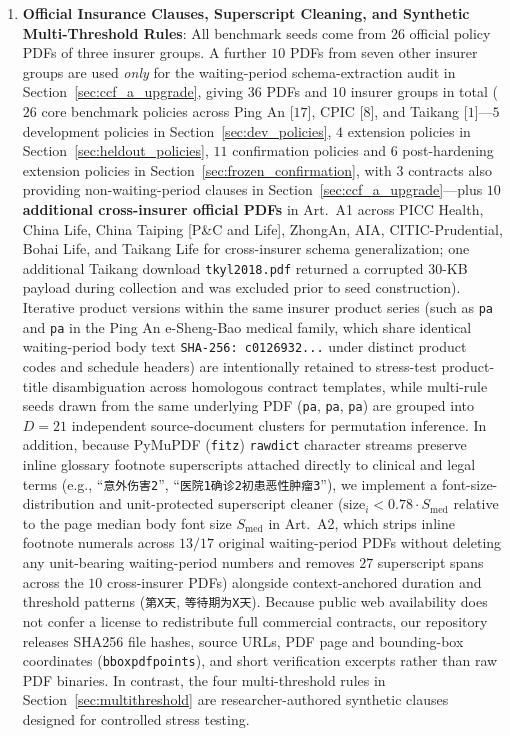 \documentclass[10pt,twocolumn]{article}
\renewcommand{\_}{\textunderscore\allowbreak}
\begin{document}
\begin{enumerate}[leftmargin=*,nosep]
  \item \textbf{Official Insurance Clauses, Superscript Cleaning, and Synthetic Multi-Threshold Rules}: All benchmark seeds come from $26$ official policy PDFs of three insurer groups. A further $10$ PDFs from seven other insurer groups are used \emph{only} for the waiting-period schema-extraction audit in Section~\ref{sec:ccf_a_upgrade}, giving $36$ PDFs and $10$ insurer groups in total ($26$ core benchmark policies across Ping An [$17$], CPIC [$8$], and Taikang [$1$]---$5$ development policies in Section~\ref{sec:dev_policies}, $4$ extension policies in Section~\ref{sec:heldout_policies}, $11$ confirmation policies and $6$ post-hardening extension policies in Section~\ref{sec:frozen_confirmation}, with $3$ contracts also providing non-waiting-period clauses in Section~\ref{sec:ccf_a_upgrade}---plus \textbf{$10$ additional cross-insurer official PDFs} in Art.~A1 across PICC Health, China Life, China Taiping [P\&C and Life], ZhongAn, AIA, CITIC-Prudential, Bohai Life, and Taikang Life for cross-insurer schema generalization; one additional Taikang download \texttt{tkyl\_2018.pdf} returned a corrupted 30-KB payload during collection and was excluded prior to seed construction). Iterative product versions within the same insurer product series (such as \texttt{pa\_595} and \texttt{pa\_597} in the Ping An e-Sheng-Bao medical family, which share identical waiting-period body text \texttt{SHA-256: c0126932...} under distinct product codes and schedule headers) are intentionally retained to stress-test product-title disambiguation across homologous contract templates, while multi-rule seeds drawn from the same underlying PDF (\texttt{pa\_2651}, \texttt{pa\_2650}, \texttt{pa\_1073}) are grouped into $D=21$ independent source-document clusters for permutation inference. In addition, because PyMuPDF (\texttt{fitz}) \texttt{rawdict} character streams preserve inline glossary footnote superscripts attached directly to clinical and legal terms (e.g., ``\texttt{意外伤害2}'', ``\texttt{医院1确诊2初患恶性肿瘤3}''), we implement a font-size-distribution and unit-protected superscript cleaner ($\text{size}_i < 0.78 \cdot S_{\text{med}}$ relative to the page median body font size $S_{\text{med}}$ in Art.~A2, which strips inline footnote numerals across $13/17$ original waiting-period PDFs without deleting any unit-bearing waiting-period numbers and removes $27$ superscript spans across the $10$ cross-insurer PDFs) alongside context-anchored duration and threshold patterns (\texttt{第X天}, \texttt{等待期为X天}). Because public web availability does not confer a license to redistribute full commercial contracts, our repository releases SHA256 file hashes, source URLs, PDF page and bounding-box coordinates (\texttt{bbox\_pdf\_points}), and short verification excerpts rather than raw PDF binaries. In contrast, the four multi-threshold rules in Section~\ref{sec:multithreshold} are researcher-authored synthetic clauses designed for controlled stress testing.

\end{enumerate}
\end{document}
